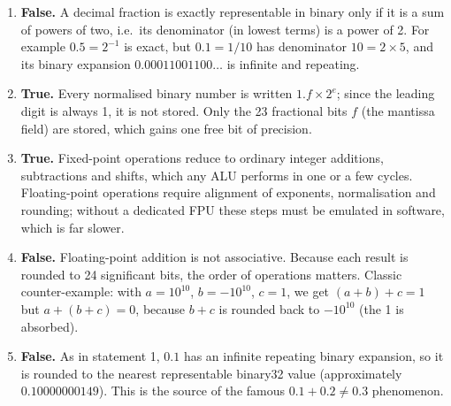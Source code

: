 \documentclass[11pt]{article}
\newcommand{\cle}[1]{{\popxbold\color{popdark}#1}}
\begin{document}
\begin{corrige}
\begin{enumerate}
\item \textbf{False.} A decimal fraction is exactly representable in binary only if it is a sum of powers of two, i.e.\ its denominator (in lowest terms) is a power of 2. For example $0.5 = 2^{-1}$ is exact, but $0.1 = 1/10$ has denominator $10 = 2\times 5$, and its binary expansion $0.00011001100\ldots$ is infinite and repeating.
\item \textbf{True.} Every \cle{normalised} binary number is written $1.f\times 2^{e}$; since the leading digit is always 1, it is not stored. Only the 23 fractional bits $f$ (the mantissa field) are stored, which gains one free bit of precision.
\item \textbf{True.} \cle{Fixed-point} operations reduce to ordinary integer additions, subtractions and shifts, which any ALU performs in one or a few cycles. Floating-point operations require alignment of exponents, normalisation and rounding; without a dedicated FPU these steps must be emulated in software, which is far slower.
\item \textbf{False.} Floating-point addition is not associative. Because each result is rounded to 24 significant bits, the order of operations matters. Classic counter-example: with $a = 10^{10}$, $b = -10^{10}$, $c = 1$, we get $(a+b)+c = 1$ but $a+(b+c) = 0$, because $b+c$ is rounded back to $-10^{10}$ (the 1 is \cle{absorbed}).
\item \textbf{False.} As in statement 1, $0.1$ has an infinite repeating binary expansion, so it is rounded to the nearest representable binary32 value (approximately $0.10000000149$). This is the source of the famous $0.1 + 0.2 \neq 0.3$ phenomenon.
\end{enumerate}
\end{corrige}
\end{document}
